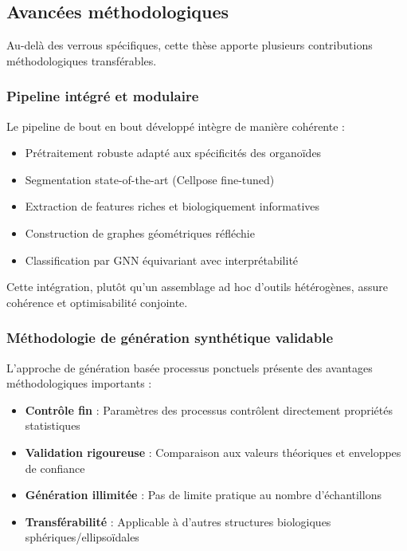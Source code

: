 \subsection{Avancées méthodologiques}

Au-delà des verrous spécifiques, cette thèse apporte plusieurs contributions méthodologiques transférables.

\subsubsection{Pipeline intégré et modulaire}

Le pipeline de bout en bout développé intègre de manière cohérente :
\begin{itemize}
    \item Prétraitement robuste adapté aux spécificités des organoïdes
    \item Segmentation state-of-the-art (Cellpose fine-tuned)
    \item Extraction de features riches et biologiquement informatives
    \item Construction de graphes géométriques réfléchie
    \item Classification par GNN équivariant avec interprétabilité
\end{itemize}

Cette intégration, plutôt qu'un assemblage ad hoc d'outils hétérogènes, assure cohérence et optimisabilité conjointe.

\subsubsection{Méthodologie de génération synthétique validable}

L'approche de génération basée processus ponctuels présente des avantages méthodologiques importants :
\begin{itemize}
    \item \textbf{Contrôle fin} : Paramètres des processus contrôlent directement propriétés statistiques
    \item \textbf{Validation rigoureuse} : Comparaison aux valeurs théoriques et enveloppes de confiance
    \item \textbf{Génération illimitée} : Pas de limite pratique au nombre d'échantillons
    \item \textbf{Transférabilité} : Applicable à d'autres structures biologiques sphériques/ellipsoïdales
\end{itemize}

